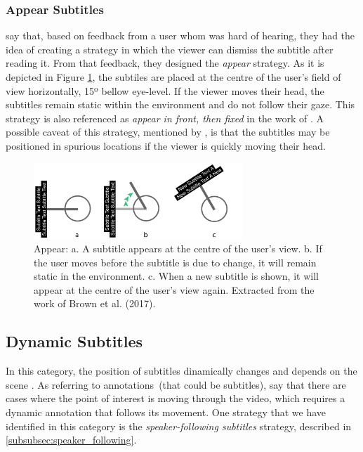 \subsubsection{Appear Subtitles}
\label{subsubsection:appear_subtitles}

 say that, based on feedback from a user whom was hard of hearing, they had the idea of creating a strategy in which the viewer can dismiss the subtitle after reading it. From that feedback, they designed the \emph{appear} strategy. As it is depicted in Figure \ref{fig:appear_subtitle}, the subtiles are placed at the centre of the user's field of view horizontally, 15º bellow eye-level. If the viewer moves their head, the subtitles remain static within the environment and do not follow their gaze. This strategy is also referenced as \emph{appear in front, then fixed} in the work of . A possible caveat of this strategy, mentioned by , is that the subtitles may be positioned in spurious locations if the viewer is quickly moving their head.

\begin{figure}[!ht]
    \centering
    \includegraphics[width=0.7\textwidth]{img/appear.png}
    \caption{Appear: a. A subtitle appears at the centre of the user's view. b. If the user moves before the subtitle is due to change, it will remain static in the environment. c. When a new subtitle is shown, it will appear at the centre of the user's view again. Extracted from the work of Brown et al. (2017).}
    \label{fig:appear_subtitle}
\end{figure}

\subsection{Dynamic Subtitles}
\label{subsection:dynamic_subtitles}

In this category, the position of subtitles dinamically changes and depends on the scene \cite{rothe_dynamic_2018}. As referring to annotations~(that could be subtitles),  say that there are cases where the point of interest is moving through the video, which requires a dynamic annotation that follows its movement. One strategy that we have identified in this category is the \emph{speaker-following subtitles} strategy, described in \ref{subsubsec:speaker_following}.

